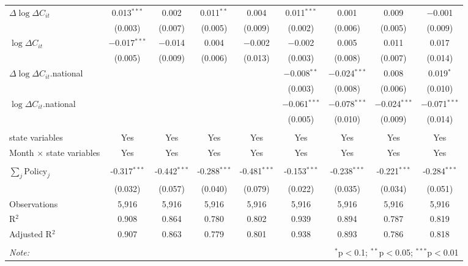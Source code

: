 \begin{tabular}{@{\extracolsep{1pt}}lcccccccc}
  $\Delta \log \Delta C_{it}$ & 0.013$^{***}$ & 0.002 & 0.011$^{**}$ & 0.004 & 0.011$^{***}$ & 0.001 & 0.009 & $-$0.001 \\ 
  & (0.003) & (0.007) & (0.005) & (0.009) & (0.002) & (0.006) & (0.005) & (0.009) \\ 
  $\log \Delta C_{it}$ & $-$0.017$^{***}$ & $-$0.014 & 0.004 & $-$0.002 & $-$0.002 & 0.005 & 0.011 & 0.017 \\ 
  & (0.005) & (0.009) & (0.006) & (0.013) & (0.003) & (0.008) & (0.007) & (0.014) \\ 
  $\Delta \log \Delta C_{it}$.national &  &  &  &  & $-$0.008$^{**}$ & $-$0.024$^{***}$ & 0.008 & 0.019$^{*}$ \\ 
  &  &  &  &  & (0.003) & (0.008) & (0.006) & (0.010) \\ 
  $\log \Delta C_{it}$.national &  &  &  &  & $-$0.061$^{***}$ & $-$0.078$^{***}$ & $-$0.024$^{***}$ & $-$0.071$^{***}$ \\ 
  &  &  &  &  & (0.005) & (0.010) & (0.009) & (0.014) \\ 
 \hline \\[-1.8ex] 
state variables & Yes & Yes & Yes & Yes & Yes & Yes & Yes & Yes \\ 
Month $\times$ state variables & Yes & Yes & Yes & Yes & Yes & Yes & Yes & Yes \\ 
\hline \\[-1.8ex] 
$\sum_j \mathrm{Policy}_j$ & -0.317$^{***}$ & -0.442$^{***}$ & -0.288$^{***}$ & -0.481$^{***}$ & -0.153$^{***}$ & -0.238$^{***}$ & -0.221$^{***}$ & -0.284$^{***}$ \\ 
 & (0.032) & (0.057) & (0.040) & (0.079) & (0.022) & (0.035) & (0.034) & (0.051) \\ 
Observations & 5,916 & 5,916 & 5,916 & 5,916 & 5,916 & 5,916 & 5,916 & 5,916 \\ 
R$^{2}$ & 0.908 & 0.864 & 0.780 & 0.802 & 0.939 & 0.894 & 0.787 & 0.819 \\ 
Adjusted R$^{2}$ & 0.907 & 0.863 & 0.779 & 0.801 & 0.938 & 0.893 & 0.786 & 0.818 \\ 
\hline 
\hline \\[-1.8ex] 
\textit{Note:}  & \multicolumn{8}{r}{$^{*}$p$<$0.1; $^{**}$p$<$0.05; $^{***}$p$<$0.01} \\ 
\end{tabular} 